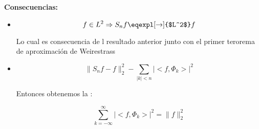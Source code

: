 		\textbf{Consecuencias:}

		\begin{itemize}

			\item  \[ f \in L^2 \Rightarrow S_n f \eqexpl[\rightarrow]{$L^2$} f \]

			Lo cual es consecuencia de l resultado anterior junto con el primer terorema de aproximación de Weirestrass

			\item \[ \| S_n f - f \|_{2}^2 - \sum_{|k|<n} | <f, \Phi_k> |^2  \]

			Entonces obtenemos la :

			\[ \sum_{k= -\infty}^\infty  |<f, \Phi_k>|^2 = \|f\|^2_2 \]


		\end{itemize}





